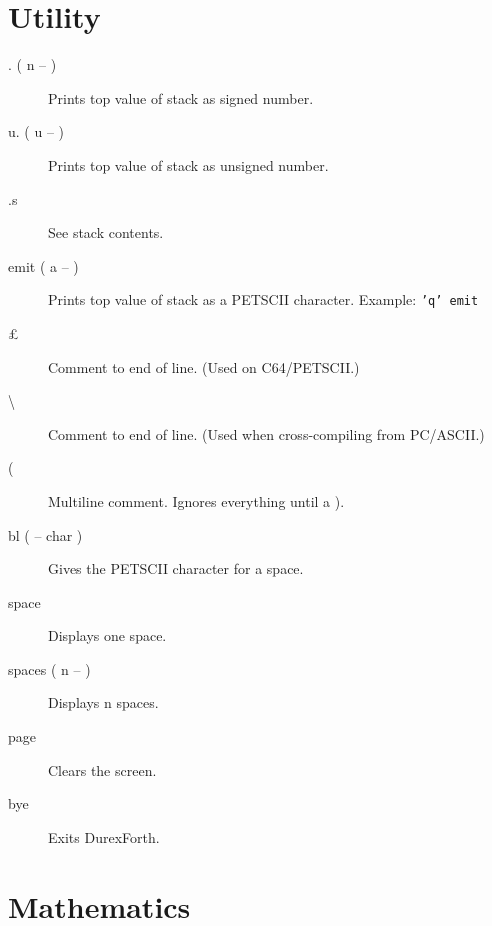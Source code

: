 \section{Utility}

\begin{description}
\item[. ( n -- )] Prints top value of stack as signed number.
\item[u. ( u -- )] Prints top value of stack as unsigned number.
\item[.s] See stack contents.
\item[emit ( a -- )] Prints top value of stack as a PETSCII character. Example: \texttt{'q' emit}
\item[\pounds] Comment to end of line. (Used on C64/PETSCII.)
\item[\textbackslash] Comment to end of line. (Used when cross-compiling from PC/ASCII.)
\item[(] Multiline comment. Ignores everything until a ).
\item[bl ( -- char )] Gives the PETSCII character for a space.
\item[space] Displays one space.
\item[spaces ( n -- )] Displays n spaces.
\item[page] Clears the screen.
\item[bye] Exits DurexForth.
\end{description}

\section{Mathematics}

